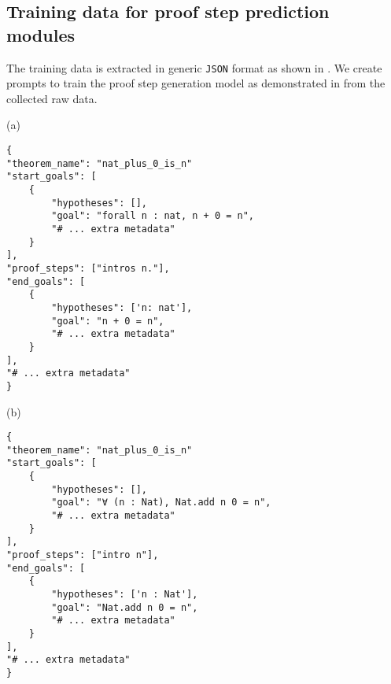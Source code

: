 \subsection{Training data for proof step prediction modules}
\label{app:training-data}
The training data is extracted in generic \texttt{JSON} format as shown in . We create prompts to train the proof step generation model as demonstrated in  from the collected raw data. 

\begin{figure*}[ht]
\begin{mdframed}[roundcorner=5pt]
\begin{minipage}{0.45\linewidth}
(a)
\begin{verbatim}
{
"theorem_name": "nat_plus_0_is_n"
"start_goals": [
    {
        "hypotheses": [],
        "goal": "forall n : nat, n + 0 = n",
        "# ... extra metadata"
    }
],
"proof_steps": ["intros n."],
"end_goals": [
    {
        "hypotheses": ['n: nat'],
        "goal": "n + 0 = n",
        "# ... extra metadata"
    }
],
"# ... extra metadata"
} 
\end{verbatim}
\end{minipage}
\begin{minipage}{0.45\linewidth}
(b)
\begin{verbatim}
{
"theorem_name": "nat_plus_0_is_n"
"start_goals": [
    {
        "hypotheses": [],
        "goal": "∀ (n : Nat), Nat.add n 0 = n",
        "# ... extra metadata"
    }
],
"proof_steps": ["intro n"],
"end_goals": [
    {
        "hypotheses": ['n : Nat'],
        "goal": "Nat.add n 0 = n",
        "# ... extra metadata"
    }
],
"# ... extra metadata"
} 
\end{verbatim}
\end{minipage}
\end{mdframed}
\caption{An excerpt from the extracted training data sequence, $\pi=\langle (O_0, a_1), \dots, (O_i, a_i), \dots (O_{n-1}, a_n)\rangle$ (see ), for a given theorem in \coq\; and \lean{}. The training data extracted here is used to train \proofwala\; proof step generation models. Here, $O_i$ i.e. set of obligations is extracted under \texttt{start\_goals} key while $O_{i+1}$ is represented under \texttt{end\_goals}. The action $a_i$ is extracted as the value of \texttt{proof\_steps} key. There are more fields other than the ones shown in the figure. (a) Shows an example of a Coq proof step, and (b) shows an example of a Lean proof step.}
\label{fig:training-data-collection-format}
\end{figure*}

